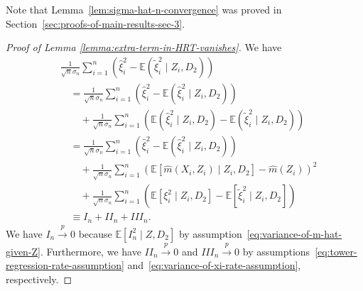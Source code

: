 \documentclass[12pt]{article}
\theoremstyle{definition}
\theoremstyle{remark}
\newcommand{\E}{\mathbb E}								%
\newcommand{\convp}{\overset p \rightarrow}             %
\newcommand{\srx}{X}									%
\newcommand{\srz}{Z}									%
\begin{document}
Note that Lemma~\ref{lem:sigma-hat-n-convergence} was proved in Section~\ref{sec:proofs-of-main-results-sec-3}.

\begin{proof}[Proof of Lemma \ref{lemma:extra-term-in-HRT-vanishes}]
We have
\begin{align*}
&\frac{1}{\sqrt{n}\sigma_n}\sum_{i = 1}^n (\widehat \xi_i^2 - \E(\widetilde \xi_i^2 \mid \srz_i, D_2)) \\
&\quad= \frac{1}{\sqrt{n}\sigma_n}\sum_{i = 1}^n \left(\widehat \xi_i^2 - \E(\widehat \xi_i^2 \mid \srz_i, D_2)\right) \\
&\quad \quad + \frac{1}{\sqrt{n}\sigma_n}\sum_{i = 1}^n \left(\E(\widehat \xi_i^2 \mid \srz_i, D_2) - \E(\widetilde \xi_i^2 \mid \srz_i, D_2)\right)\\
&\quad=\frac{1}{\sqrt{n}\sigma_n}\sum_{i = 1}^n \left(\widehat \xi_i^2 - \E(\widehat \xi_i^2 \mid \srz_i, D_2)\right) \\
&\quad \quad + \frac{1}{\sqrt{n}\sigma_n}\sum_{i = 1}^n (\E[\widehat m(\srx_i, \srz_i) \mid \srz_i,D_2] - \widehat m(\srz_i))^2 \\
&\quad \quad + \frac{1}{\sqrt{n}\sigma_n}\sum_{i = 1}^n (\E[\xi_i^2 \mid \srz_i,D_2]-\E[\widetilde \xi_i^2 \mid \srz_i,D_2]) \\
&\quad \equiv I_n + II_n + III_n.
\end{align*}
We have $I_n \convp 0$ because $\E[I_n^2 \mid \srz,D_2]$ by assumption~\eqref{eq:variance-of-m-hat-given-Z}. Furthermore, we have $II_n \convp 0$ and $III_n \convp 0$ by assumptions~\eqref{eq:tower-regression-rate-assumption} and~\eqref{eq:variance-of-xi-rate-assumption}, respectively. 
\end{proof}
\end{document}
